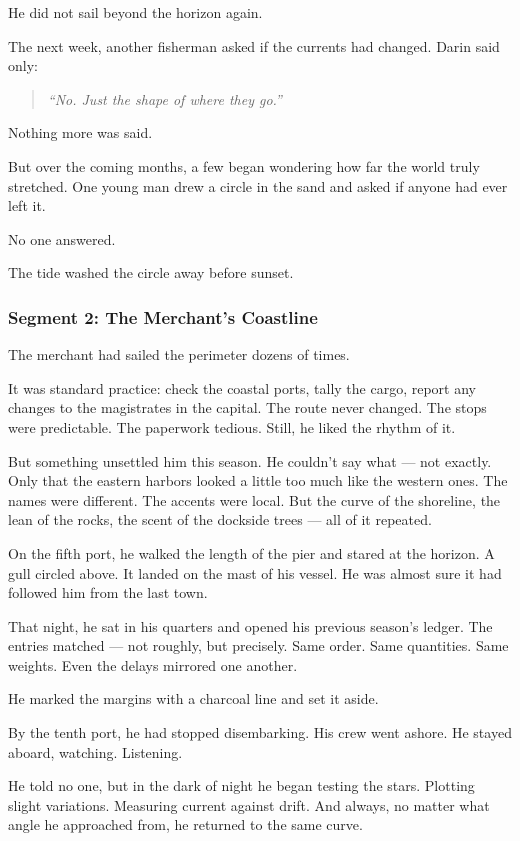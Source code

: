 \documentclass[9pt]{article}
\begin{document}
He did not sail beyond the horizon again.

The next week, another fisherman asked if the currents had changed. Darin said only:

\begin{quote}
\emph{``No. Just the shape of where they go.''}
\end{quote}

Nothing more was said.

But over the coming months, a few began wondering how far the world truly stretched. One young man drew a circle in the sand and asked if anyone had ever left it.

No one answered.

The tide washed the circle away before sunset.

\newpage

\subsubsection*{Segment 2: The Merchant’s Coastline}

The merchant had sailed the perimeter dozens of times.

It was standard practice: check the coastal ports, tally the cargo, report any changes to the magistrates in the capital. The route never changed. The stops were predictable. The paperwork tedious. Still, he liked the rhythm of it.

But something unsettled him this season. He couldn’t say what — not exactly. Only that the eastern harbors looked a little too much like the western ones. The names were different. The accents were local. But the curve of the shoreline, the lean of the rocks, the scent of the dockside trees — all of it repeated.

On the fifth port, he walked the length of the pier and stared at the horizon. A gull circled above. It landed on the mast of his vessel. He was almost sure it had followed him from the last town.

That night, he sat in his quarters and opened his previous season’s ledger. The entries matched — not roughly, but precisely. Same order. Same quantities. Same weights. Even the delays mirrored one another.

He marked the margins with a charcoal line and set it aside.

By the tenth port, he had stopped disembarking. His crew went ashore. He stayed aboard, watching. Listening.

He told no one, but in the dark of night he began testing the stars. Plotting slight variations. Measuring current against drift. And always, no matter what angle he approached from, he returned to the same curve.
\end{document}
